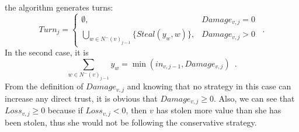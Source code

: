 \documentclass[11pt]{llncs}
\theoremstyle{definition}
\begin{document}
     the algorithm generates turns:
     \begin{equation}
        Turn_j =
          \begin{cases}
             \emptyset, & Damage_{v,j} = 0 \\
             \bigcup\limits_{w \in N^{-}\left(v\right)_{j-1}}\{Steal\left(y_w,w\right)\}, & Damage_{v, j} > 0
          \end{cases} \enspace.
     \end{equation}
     In the second case, it is
     \begin{equation}
        \sum\limits_{w \in N^{-}\left(v\right)_{j-1}}y_w = \min\left(in_{v, j-1}, Damage_{v, j}\right) \enspace.
     \end{equation}
     From the definition of $Damage_{v,j}$ and knowing that no strategy in this case can increase any direct trust, it is
     obvious that $Damage_{v,j} \geq 0$. Also, we can see that $Loss_{v,j} \geq 0$ because if $Loss_{v,j} < 0$, then $v$ has
     stolen more value than she has been stolen, thus she would not be following the conservative strategy.
\end{document}
